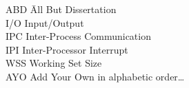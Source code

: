 
%
%
\begingroup
\newcommand{\Ab}[2]{\noindent  #1 \> #2 \\}
\newcommand{\Abi}[2]{\noindent #1 \hspace{1.5cm} \= #2 \\}
\begin{tabbing}
    \Abi{ABD}{All But Dissertation}

    \Ab{I/O}{Input/Output}
    \Ab{IPC}{Inter-Process Communication}
    \Ab{IPI}{Inter-Processor Interrupt}
    \Ab{WSS}{Working Set Size}
    \Ab{AYO}{Add Your Own in alphabetic order\ldots}
\end{tabbing}
\endgroup
\clearpage
